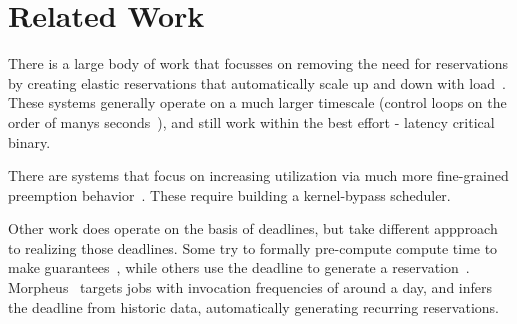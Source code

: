 \section{Related Work}

There is a large body of work that focusses on removing the need for
reservations by creating elastic reservations that automatically scale up and
down with load~\cite*{kubernetes, snowflake}. These systems generally
operate on a much larger timescale (control loops on the order of manys
seconds~\cite{kubernetestime}), and still work within the best effort
- latency critical binary. 

There are systems that focus on increasing utilization via much more
fine-grained preemption behavior~\cite*{caladan, shinjuku}. These require
building a kernel-bypass scheduler. 

Other work does operate on the basis of deadlines, but take different appproach
to realizing those deadlines. Some try to formally pre-compute compute time to
make guarantees~\cite{jockey}, while others use the deadline to generate a
reservation~\cite*{rayon}. Morpheus~\cite*{morpheus} targets jobs with
invocation frequencies of around a day, and infers the deadline from historic
data, automatically generating recurring reservations.

